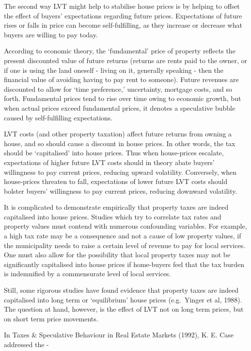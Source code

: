 \documentclass[]{tufte-handout}
\begin{document}
The second way LVT might help to stabilise house prices is by helping to
offset the effect of buyers' expectations regarding future prices.
Expectations of future rises or falls in price can become
self-fulfilling, as they increase or decrease what buyers are willing to
pay today.

According to economic theory, the `fundamental' price of property
reflects the present discounted value of future returns (returns are
rents paid to the owner, or if one is using the land oneself - living on
it, generally speaking - then the financial value of avoiding having to
pay rent to someone). Future revenues are discounted to allow for `time
preference,' uncertainty, mortgage costs, and so forth. Fundamental
prices tend to rise over time owing to economic growth, but when actual
prices exceed fundamental prices, it denotes a speculative bubble caused
by self-fulfilling expectations.

LVT costs (and other property taxation) affect future returns from
owning a house, and so should cause a discount in house prices. In other
words, the tax should be `capitalised' into house prices. Thus when
house-prices escalate, expectations of higher future LVT costs should in
theory abate buyers' willingness to pay current prices, reducing upward
volatility. Conversely, when house-prices threaten to fall, expectations
of lower future LVT costs should bolster buyers' willingness to pay
current prices, reducing downward volatility.

It is complicated to demonstrate empirically that property taxes are
indeed capitalised into house prices. Studies which try to correlate tax
rates and property values must contend with numerous confounding
variables. For example, a high tax rate may be a consequence and not a
cause of low property values, if the municipality needs to raise a
certain level of revenue to pay for local services. One must also allow
for the possibility that local property taxes may not be significantly
capitalised into house prices if home-buyers feel that the tax burden is
indemnified by a commensurate level of local services.

Still, some rigorous studies have found evidence that property taxes are
indeed capitalised into long term or `equilibrium' house prices
(e.g.~Yinger et al, 1988). The question at hand, however, is the effect
of LVT not on long term prices, but on short term price movements.

In Taxes \& Speculative Behaviour in Real Estate Markets (1992), K. E.
Case addressed the -
\end{document}
